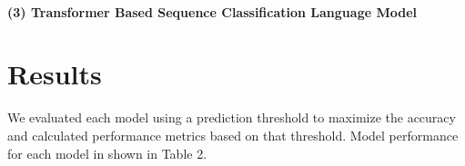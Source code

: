 \documentclass[pmlr,twocolumn,10pt]{jmlr} %
\begin{document}

\label{sec:Transformer}  
\paragraph{(3) Transformer Based Sequence Classification Language Model} %

\section{Results}
\label{sec:Results}  

We evaluated each model using a prediction threshold to maximize the accuracy and calculated performance metrics based on that threshold. Model performance for each model in shown in Table 2. 
\end{document}
